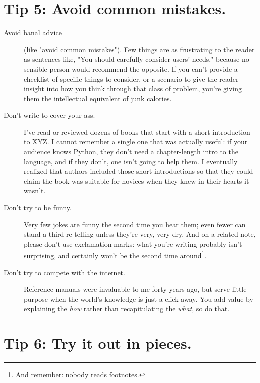 \documentclass[10pt,letterpaper]{article}
\begin{document}
\section*{Tip 5: Avoid common mistakes.}

\begin{description}

\item[Avoid banal advice]
  (like "avoid common mistakes").
  Few things are as frustrating to the reader as sentences like,
  "You should carefully consider users' needs,"
  because no sensible person would recommend the opposite.
  If you can't provide a checklist of specific things to consider,
  or a scenario to give the reader insight into how you think through that class of problem,
  you're giving them the intellectual equivalent of junk calories.

\item[Don't write to cover your ass.]
  I've read or reviewed dozens of books that start with a short introduction to XYZ.
  I cannot remember a single one that was actually useful:
  if your audience knows Python,
  they don't need a chapter-length intro to the language,
  and if they don't,
  one isn't going to help them.
  I eventually realized that authors included those short introductions
  so that they could claim the book was suitable for novices
  when they knew in their hearts it wasn't.

\item[Don't try to be funny.]
  Very few jokes are funny the second time you hear them;
  even fewer can stand a third re-telling unless they're very, very dry.
  And on a related note,
  please don't use exclamation marks:
  what you're writing probably isn't surprising,
  and certainly won't be the second time around\footnote{
    And remember: nobody reads footnotes.
  }.

\item[Don't try to compete with the internet.]
  Reference manuals were invaluable to me forty years ago,
  but serve little purpose when the world's knowledge is just a click away.
  You add value by explaining the \emph{how} rather than recapitulating the \emph{what},
  so do that.

\end{description}

\section*{Tip 6: Try it out in pieces.}
\end{document}
